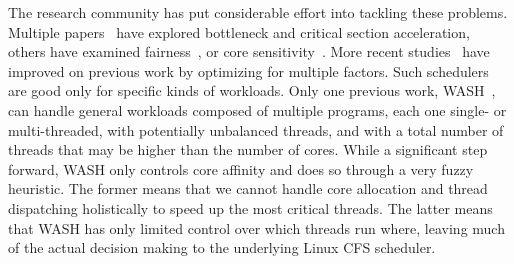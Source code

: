 


The research community has put considerable effort into tackling these problems. Multiple papers~\cite{han2018multicore,chronaki2017task,joao2012bottleneck,suleman2009accelerating,du2013criticality} have explored bottleneck and critical section acceleration, others have examined fairness~\cite{zahedi2018amdahl,wang2016rebudget,van2012scheduling,li2009efficient,li2007efficient}, or core sensitivity~\cite{cao2012yin,kumar2004single,becchi2006dynamic}. More recent studies~\cite{kim2018exploring,kim2016fairness,saez2012leveraging,van2013fairness,joao2013utility} have improved on previous work by optimizing for multiple factors.
Such schedulers are good only for specific kinds of workloads. Only one previous work, WASH~\cite{jibaja2016portable}, can handle general workloads composed of multiple programs, each one single- or multi-threaded, with potentially unbalanced threads, and with a total number of threads that may be higher than the number of cores. While a significant step forward, WASH only controls core affinity and does so through a very fuzzy heuristic. The former means that we cannot handle core allocation and thread dispatching holistically to speed up the most critical threads. The latter means that WASH has only limited control over which threads run where, leaving much of the actual decision making to the underlying Linux CFS scheduler.

